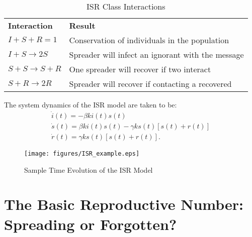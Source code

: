 \begin{table}[!htbp] \centering
\centering

\begin{tabular}{ll}
\textbf{Interaction}      & \textbf{Result}                                   \\
$I + S + R = 1$           & Conservation of individuals in the population     \\
$I + S \rightarrow 2S$    & Spreader will infect an ignorant with the message \\
$S + S \rightarrow S + R$ & One spreader will recover if two interact         \\
$S + R \rightarrow 2R$    & Spreader will recover if contacting a recovered   \\
\end{tabular}
\caption{ISR Class Interactions}
\label{tab:sir_interactions}
\end{table}

\noindent The system dynamics of the ISR model are taken to be:
\begin{equation}\label{eqn:ISR_dynamics}
\left.\begin{aligned}
\dot{i}(t) = -\beta k i(t)s(t)\\
\dot{s}(t) = \beta k i(t)s(t) - \gamma k s(t)[s(t)+r(t)]\\
\dot{r}(t) = \gamma k s(t)[s(t)+r(t)].
\end{aligned}\right.
\end{equation}

\begin{figure}[!htbp] \centering
  \texttt{[image: figures/ISR\_example.eps]}
  \caption{Sample Time Evolution of the ISR Model}
  \label{fig:ISR}
\end{figure}

\section{The Basic Reproductive Number: Spreading or Forgotten?}

